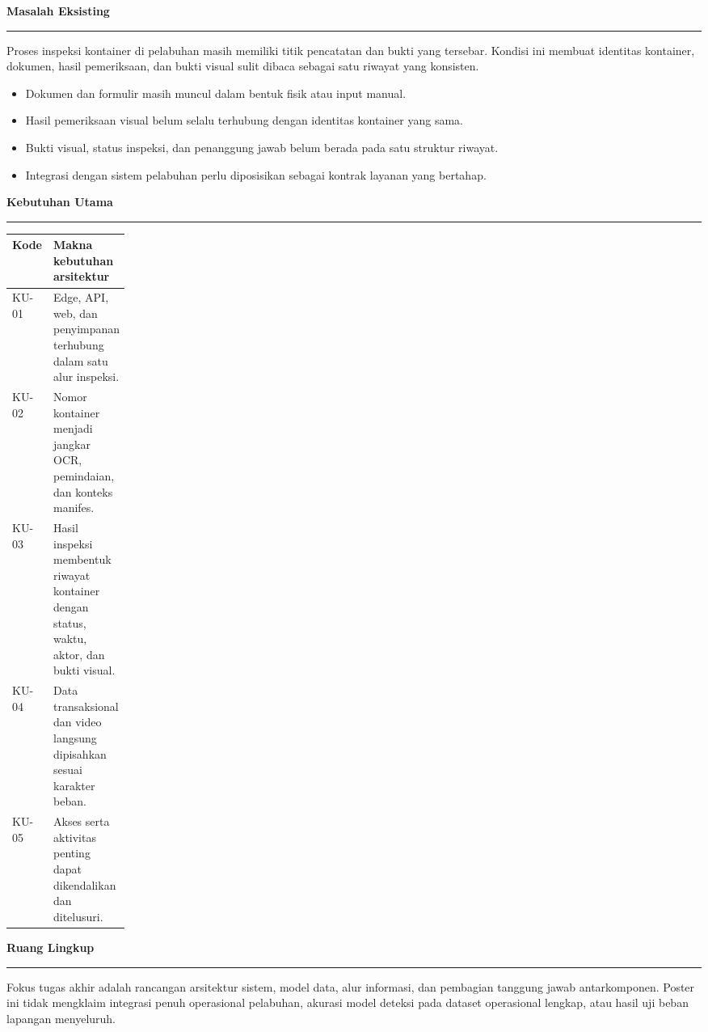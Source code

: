 \documentclass[12pt]{article}
\newcommand{\smallbody}{\fontsize{14.4}{17.8}\selectfont}
\newcommand{\boxhead}[1]{%
  {\color{Navy}\bfseries\fontsize{25.0}{29.0}\selectfont #1}\par
  \vspace{1.4mm}
  {\color{Teal}\rule{\linewidth}{1.1pt}}\par
  \vspace{2.4mm}
}
\begin{document}
\begin{minipage}[t]{0.285\textwidth}
  \vspace{0pt}
  \begin{sectionbox}
    \boxhead{Masalah Eksisting}
    Proses inspeksi kontainer di pelabuhan masih memiliki titik pencatatan dan
    bukti yang tersebar. Kondisi ini membuat identitas kontainer, dokumen,
    hasil pemeriksaan, dan bukti visual sulit dibaca sebagai satu riwayat yang
    konsisten.
    \begin{itemize}
      \item Dokumen dan formulir masih muncul dalam bentuk fisik atau input manual.
      \item Hasil pemeriksaan visual belum selalu terhubung dengan identitas kontainer yang sama.
      \item Bukti visual, status inspeksi, dan penanggung jawab belum berada pada satu struktur riwayat.
      \item Integrasi dengan sistem pelabuhan perlu diposisikan sebagai kontrak layanan yang bertahap.
    \end{itemize}
  \end{sectionbox}

  \begin{sectionbox}
    \boxhead{Kebutuhan Utama}
    \smallbody
    \renewcommand{\arraystretch}{1.18}
    \begin{tabularx}{\linewidth}{L{0.17\linewidth}Y}
      \toprule
      \textbf{Kode} & \textbf{Makna kebutuhan arsitektur} \\
      \midrule
      KU-01 & Edge, API, web, dan penyimpanan terhubung dalam satu alur inspeksi. \\
      KU-02 & Nomor kontainer menjadi jangkar OCR, pemindaian, dan konteks manifes. \\
      KU-03 & Hasil inspeksi membentuk riwayat kontainer dengan status, waktu, aktor, dan bukti visual. \\
      KU-04 & Data transaksional dan video langsung dipisahkan sesuai karakter beban. \\
      KU-05 & Akses serta aktivitas penting dapat dikendalikan dan ditelusuri. \\
      \bottomrule
    \end{tabularx}
  \end{sectionbox}

  \begin{sectionbox}
    \boxhead{Ruang Lingkup}
    Fokus tugas akhir adalah rancangan arsitektur sistem, model data, alur
    informasi, dan pembagian tanggung jawab antarkomponen. Poster ini tidak
    mengklaim integrasi penuh operasional pelabuhan, akurasi model deteksi pada
    dataset operasional lengkap, atau hasil uji beban lapangan menyeluruh.
    \vspace{2mm}


\end{sectionbox}
\end{minipage}
\end{document}
